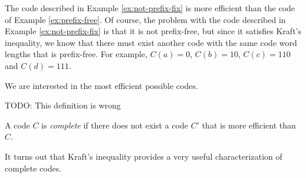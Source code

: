 \begin{example}
The code described in Example \ref{ex:not-prefix-fix} is more efficient than the code of Example \ref{ex:prefix-free}. Of course, the problem with the code described in Example \ref{ex:not-prefix-fix} is that it is not prefix-free, but since it satisfies Kraft's inequality, we know that there must exist another code with the same code word lengths that is prefix-free. For example, $C(a)=0$, $C(b)=10$, $C(c)=110$ and $C(d)=111$.
\end{example}

We are interested in the most efficient possible codes.

{\color{red} TODO: This definition is wrong}

\begin{definition}
A code $C$ is \emph{complete} if there does not exist a code $C'$ that is more efficient than $C$.
\end{definition}

It turns out that Kraft's inequality provides a very useful characterization of complete codes.

